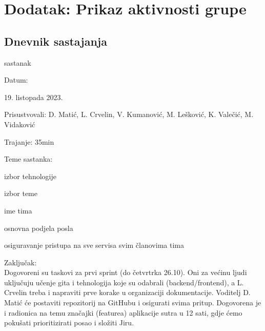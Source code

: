 \chapter*{Dodatak: Prikaz aktivnosti grupe}
		
		\section*{Dnevnik sastajanja}
		
		\begin{packed_enum}
			\item  sastanak
			
			\item[] \begin{packed_item}
				\item Datum: \date[{19. listopada 2023.} %
				\item Prisustvovali: D. Matić, L. Crvelin, V. Kumanović, M. Lešković, K. Valečić, M. Vidaković
				\item Trajanje: 35min
				\item Teme sastanka:
				\begin{packed_item}
					\item  izbor tehnologije
					\item  izbor teme
                    \item  ime tima
                    \item  osnovna podjela posla
                    \item  osiguravanje pristupa na sve servisa svim članovima tima
				\end{packed_item}
            \item Zaključak: \\Dogovoreni su taskovi za prvi sprint (do četvrtrka 26.10). Oni za većinu ljudi uključuju učenje gita i tehnologija koje su odabrali (backend/frontend), a L. Crvelin treba i napraviti prve korake u organizaciji dokumentacije. Voditelj D. Matić će postaviti repozitorij na GitHubu i osigurati svima pritup. Dogovorena je i radionica na temu značajki (featurea) aplikacije sutra u 12 sati, gdje ćemo pokušati prioritizirati posao i složiti Jiru.
			\end{packed_item}


\end{packed_enum}
